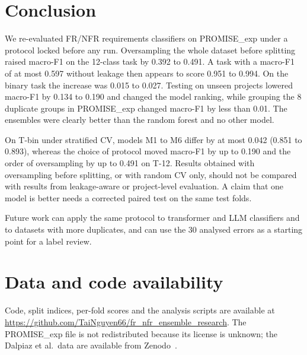 \section{Conclusion}
\label{sec:conclusion}
We re-evaluated FR/NFR requirements classifiers on PROMISE\_exp under a protocol locked before any run. Oversampling the whole dataset before splitting raised macro-F1 on the 12-class task by 0.392 to 0.491. A task with a macro-F1 of at most 0.597 without leakage then appears to score 0.951 to 0.994. On the binary task the increase was 0.015 to 0.027. Testing on unseen projects lowered macro-F1 by 0.134 to 0.190 and changed the model ranking, while grouping the 8 duplicate groups in PROMISE\_exp changed macro-F1 by less than 0.01. The ensembles were clearly better than the random forest and no other model.

On T-bin under stratified CV, models M1 to M6 differ by at most 0.042 (0.851 to 0.893), whereas the choice of protocol moved macro-F1 by up to 0.190 and the order of oversampling by up to 0.491 on T-12. Results obtained with oversampling before splitting, or with random CV only, should not be compared with results from leakage-aware or project-level evaluation. A claim that one model is better needs a corrected paired test on the same test folds.

Future work can apply the same protocol to transformer and LLM classifiers and to datasets with more duplicates, and can use the 30 analysed errors as a starting point for a label review.

\section*{Data and code availability}
Code, split indices, per-fold scores and the analysis scripts are available at \url{https://github.com/TaiNguyen66/fr_nfr_ensemble_research}. The PROMISE\_exp file is not redistributed because its license is unknown; the Dalpiaz et al.\ data are available from Zenodo~\cite{dalpiaz2019data}.
